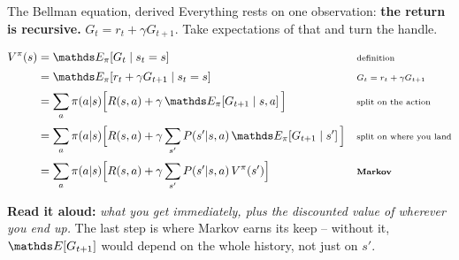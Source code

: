 \documentclass[aspectratio=169]{beamer}
\begin{document}
\begin{frame}{The Bellman equation, derived}
  \small
  Everything rests on one observation: \textbf{the return is recursive.}
  $G_t = r_t + \gamma G_{t+1}$. Take expectations of that and turn the handle.

  \vskip 4pt
  \begin{tcolorbox}[colback=lightbg, colframe=popblue, boxrule=0.7pt, arc=2pt]
    \footnotesize
    \begin{align*}
      V^\pi(s) &= \E_\pi\!\left[ G_t \mid s_t = s \right]
        && \text{\scriptsize definition} \\[2pt]
      &= \E_\pi\!\left[ r_t + \gamma G_{t+1} \mid s_t = s \right]
        && \text{\scriptsize $G_t = r_t + \gamma G_{t+1}$} \\[2pt]
      &= \sum_a \pi(a|s) \Big[ R(s,a) + \gamma \,\E_\pi\!\left[ G_{t+1} \mid s,a \right] \Big]
        && \text{\scriptsize split on the action} \\[2pt]
      &= \sum_a \pi(a|s) \Big[ R(s,a) + \gamma \sum_{s'} P(s'|s,a)\, \E_\pi\!\left[ G_{t+1} \mid s' \right] \Big]
        && \text{\scriptsize split on where you land} \\[2pt]
      &= \sum_a \pi(a|s) \Big[ R(s,a) + \gamma \sum_{s'} P(s'|s,a)\, V^\pi(s') \Big]
        && \text{\scriptsize \textbf{Markov}}
    \end{align*}
  \end{tcolorbox}

  \vskip 2pt
  \begin{tcolorbox}[colback=paramgreen!8, colframe=paramgreen, boxrule=0.6pt, arc=2pt]
    \footnotesize
    \textbf{Read it aloud:} \emph{what you get immediately, plus the discounted value of
    wherever you end up.} The last step is where Markov earns its keep -- without it,
    $\E[G_{t+1}]$ would depend on the whole history, not just on $s'$.
  \end{tcolorbox}
\end{frame}
\end{document}
